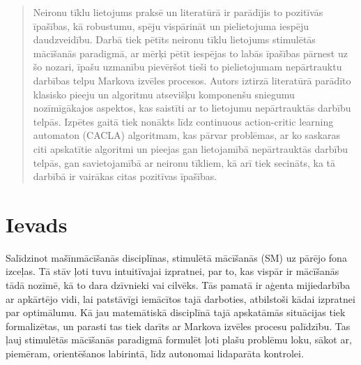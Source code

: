 \documentclass[a0,landscape]{a0poster}
\numberwithin{equation}{section}
\theoremstyle{definition}
\theoremstyle{plain}
\begin{document}
\begin{multicols}{4} %


\color{Navy} %

\begin{abstract}

Neironu tīklu lietojums praksē un literatūrā ir parādījis to pozitīvās īpašības, kā robustumu, spēju vispārināt un pielietojuma iespēju daudzveidību.
Darbā tiek pētīts neironu tīklu lietojums stimulētās mācīšanās paradigmā, ar mērķi pētīt iespējas to labās īpašības pārnest uz šo nozari, īpašu uzmanību pievēršot tieši to pielietojumam nepārtrauktu darbības telpu Markova izvēles procesos.
Autors iztirzā literatūrā parādīto klasisko pieeju un algoritmu atsevišķu komponenšu sniegumu nozīmīgākajos aspektos, kas saistīti ar to lietojumu nepārtrauktās darbību telpās.
Izpētes gaitā tiek nonākts līdz continuous action-critic learning automaton (CACLA) algoritmam, kas pārvar problēmas, ar ko saskaras citi apskatītie algoritmi un pieejas gan lietojamībā nepārtrauktās darbību telpās, gan savietojamībā ar neironu tīkliem, kā arī tiek secināts, ka tā darbībā ir vairākas citas pozitīvas īpašības.

\end{abstract}


\color{SaddleBrown} %

\section*{Ievads}

Salīdzinot mašīnmācīšanās disciplīnas, stimulētā mācīšanās (SM) uz pārējo fona izceļas.
Tā stāv ļoti tuvu intuitīvajai izpratnei, par to, kas vispār ir mācīšanās tādā nozīmē, kā to dara dzīvnieki vai cilvēks.
Tās pamatā ir aģenta mijiedarbība ar apkārtējo vidi, lai patstāvīgi iemācītos tajā darboties, atbilstoši kādai izpratnei par optimālumu.
Kā jau matemātiskā disciplīnā tajā apskatāmās situācijas tiek formalizētas, un parasti tas tiek darīts ar Markova izvēles procesu palīdzību.
Tas ļauj stimulētās mācīšanās paradigmā formulēt ļoti plašu problēmu loku, sākot ar, piemēram, orientēšanos labirintā, līdz autonomai lidaparāta kontrolei.


\end{multicols}
\end{document}
